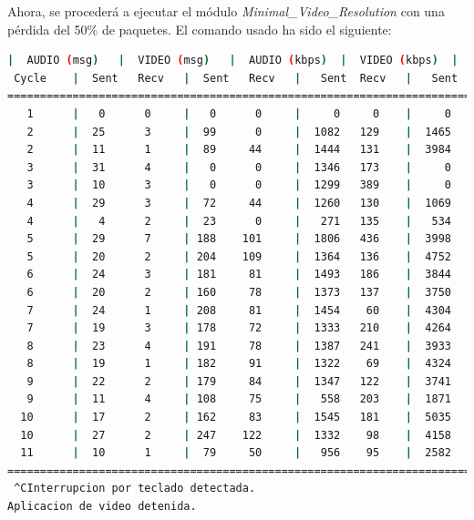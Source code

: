 \newpage

Ahora, se procederá a ejecutar el módulo \textit{Minimal\_Video\_Resolution} con una pérdida del 50\% de paquetes. El comando usado ha sido el siguiente:

\begin{lstlisting}[language=bash,basicstyle=\ttfamily\scriptsize]
          |  AUDIO (msg)   |  VIDEO (msg)   |  AUDIO (kbps)  |  VIDEO (kbps)  |   CPU (%)
 Cycle    |  Sent   Recv   |  Sent   Recv   |   Sent  Recv   |   Sent  Recv   | Program System
============================================================================================
   1      |   0      0     |   0      0     |     0     0    |     0     0    |   0      0
   2      |  25      3     |  99      0     |  1082   129    |  1465      0   |  40     75
   2      |  11      1     |  89     44     |  1444   131    |  3984   1975   |  32     75
   3      |  31      4     |   0      0     |  1346   173    |     0      0   |  43     90
   3      |  10      3     |   0      0     |  1299   389    |     0      0   |  43     92
   4      |  29      3     |  72     44     |  1260   130    |  1069    653   |  43     93
   4      |   4      2     |  23      0     |   271   135    |   534      0   |  41     64
   5      |  29      7     | 188    101     |  1806   436    |  3998   2150   |  38     52
   5      |  20      2     | 204    109     |  1364   136    |  4752   2536   |  41     84
   6      |  24      3     | 181     81     |  1493   186    |  3844   1717   |  41     87
   6      |  20      2     | 160     78     |  1373   137    |  3750   1831   |  44     87
   7      |  24      1     | 208     81     |  1454    60    |  4304   1678   |  22     82
   7      |  19      3     | 178     72     |  1333   210    |  4264   1727   |  21     83
   8      |  23      4     | 191     78     |  1387   241    |  3933   1603   |  18     83
   8      |  19      1     | 182     91     |  1322    69    |  4324   2164   |  21     81
   9      |  22      2     | 179     84     |  1347   122    |  3741   1753   |  20     83
   9      |  11      4     | 108     75     |   558   203    |  1871   1302   |  38     58
  10      |  17      2     | 162     83     |  1545   181    |  5035   2579   |  16     54
  10      |  27      2     | 247    122     |  1332    98    |  4158   2058   |  16     84
  11      |  10      1     |  79     50     |   956    95    |  2582   1634   |   5     85
============================================================================================
 ^CInterrupcion por teclado detectada.
Aplicacion de video detenida.


\end{lstlisting}
